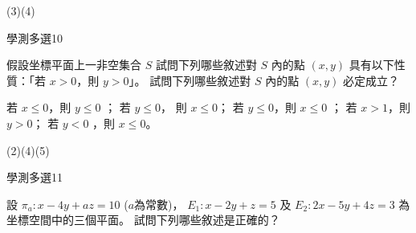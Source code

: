 \begin{QUESTIONS}
\begin{QUESTION}
\begin{QFROMS}
        \end{QFROMS}
        \begin{QTAGS}\end{QTAGS}
        \begin{QANS}
            (3)(4)
        \end{QANS}
        \begin{QSOLLIST}
        \end{QSOLLIST}
        \begin{QEMPTYSPACE}
        \end{QEMPTYSPACE}
    \end{QUESTION}
    \begin{QUESTION}
        \begin{ExamInfo}{92}{學測}{多選}{10}
        \end{ExamInfo}
        \begin{ExamAnsRateInfo}{21}{43}{14}{6}
        \end{ExamAnsRateInfo}
        \begin{QBODY}
            假設坐標平面上一非空集合 $S$ 試問下列哪些敘述對 $S$ 內的點 $(x, y)$ 具有以下性質：「若  $x > 0$，則 $y > 0$」。 試問下列哪些敘述對 $S$ 內的點 $(x, y)$ 必定成立？ 
            \begin{QOPS} 
                \QOP 若 $x \leq 0$，則 $y \leq 0$ ；
                \QOP 若 $y \leq 0$， 則 $x \leq 0$；
                \QOP 若 $y \leq 0$，則 $x \leq 0$ ； 
                \QOP 若 $x >1$，則 $y>0$；  \QOP 若 $y<0$ ，則 $x \leq 0$。
            \end{QOPS}
        \end{QBODY}
        \begin{QFROMS}
        \end{QFROMS}
        \begin{QTAGS}\end{QTAGS}
        \begin{QANS}
            (2)(4)(5)
        \end{QANS}
        \begin{QSOLLIST}
        \end{QSOLLIST}
        \begin{QEMPTYSPACE}
        \end{QEMPTYSPACE}
    \end{QUESTION}
    \begin{QUESTION}
        \begin{ExamInfo}{92}{學測}{多選}{11}
        \end{ExamInfo}
        \begin{ExamAnsRateInfo}{24}{43}{18}{11}
        \end{ExamAnsRateInfo}
        \begin{QBODY}
            設 $\pi_a : x-4y +az=10$ ($a$為常數)， $E_1 :x-2y+z=5$ 及 $E_2  :2x-5y+4z=3$ 為坐標空間中的三個平面。
            試問下列哪些敘述是正確的？
            

\end{QBODY}
\end{QUESTION}
\end{QUESTIONS}
